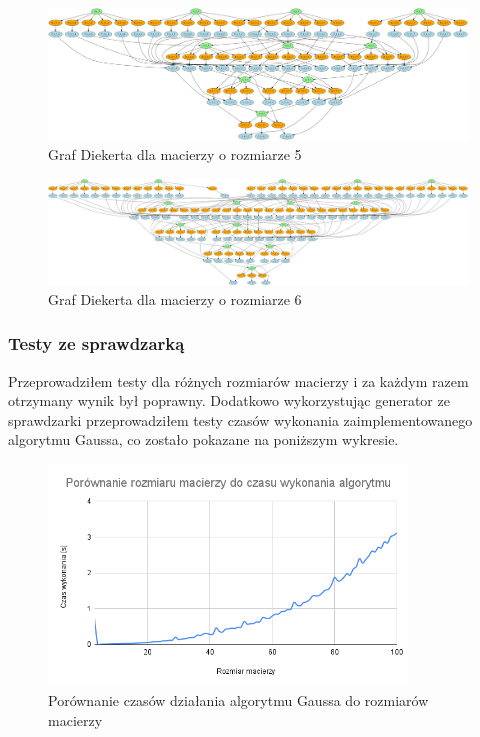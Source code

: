 \documentclass{article}
\begin{document}
\begin{figure}[H]
  \centering
    \includegraphics[width=0.99\textwidth]{images/diekert_graph_ex_5.png}
  \caption{Graf Diekerta dla macierzy o rozmiarze 5}
\end{figure}

\begin{figure}[H]
  \centering
    \includegraphics[width=0.99\textwidth]{images/diekert_graph_ex_6.png}
  \caption{Graf Diekerta dla macierzy o rozmiarze 6}
\end{figure}

\subsubsection{Testy ze sprawdzarką}

Przeprowadziłem testy dla różnych rozmiarów macierzy i za każdym razem otrzymany wynik był poprawny. Dodatkowo wykorzystując generator ze sprawdzarki przeprowadziłem testy czasów wykonania zaimplementowanego algorytmu Gaussa, co zostało pokazane na poniższym wykresie.

\begin{figure}[H]
  \centering
    \includegraphics[width=0.85\textwidth]{images/time.png}
  \caption{Porównanie czasów działania algorytmu Gaussa do rozmiarów macierzy}
\end{figure}
\end{document}
